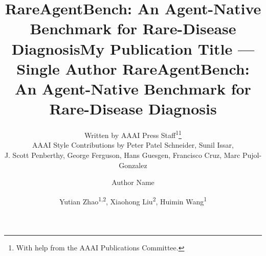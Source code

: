 \documentclass[letterpaper]{article} %
\title{
RareAgentBench: An Agent-Native Benchmark for Rare-Disease Diagnosis}
\author{
    Written by AAAI Press Staff\textsuperscript{\rm 1}\thanks{With help from the AAAI Publications Committee.}\\
    AAAI Style Contributions by Peter Patel Schneider,
    Sunil Issar,\\
    J. Scott Penberthy,
    George Ferguson,
    Hans Guesgen,
    Francisco Cruz\equalcontrib\corresponding,
    Marc Pujol-Gonzalez\equalcontrib\corresponding
}
\title{My Publication Title --- Single Author}
\author {
    Author Name
}
\title{
RareAgentBench: An Agent-Native Benchmark for Rare-Disease Diagnosis
}
\author {
    Yutian Zhao\textsuperscript{\rm 1,\rm 2}, %
    Xiaohong Liu\textsuperscript{\rm 2},
    Huimin Wang\textsuperscript{\rm 1}\corresponding
}
\begin{document}
\maketitle

\begin{abstract}


\end{abstract}
\end{document}
